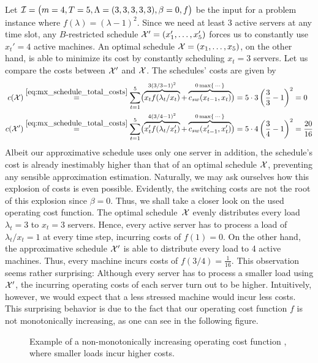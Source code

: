 \begin{exmpl}
Let $\mathcal{I}=\bigl(m=4,T=5,\Lambda=(3,3,3,3,3),\beta=0,f\bigr)$ be the input for a problem instance where $f(\lambda)=(\lambda-1)^2$. Since we need at least 3 active servers at any time slot, any $B$-restricted schedule $\mathcal{X}'=(x_1',\dotsc,x_5')$ forces us to constantly use $x_t'=4$ active machines. An optimal schedule $\mathcal{X}=(x_1,\dotsc,x_5)$, on the other hand, is able to minimize its cost by constantly scheduling $x_t=3$ servers. Let us compare the costs between $\mathcal{X}'$ and $\mathcal{X}$. The schedules' costs are given by
\begin{align*}
	c(\mathcal{X})&\stackrel{\eqref{eq:mx_schedule_total_costs}}{=}\sum\limits_{t=1}^{5}\bigl(\overbrace{x_tf(\lambda_t/x_t)}^{3(3/3-1)^2}+\overbrace{c_{sw}(x_{t-1},x_t)}^{0\max\{\,\cdots\}}\bigr)=5\cdot3\left(\frac{3}{3}-1\right)^2=0\\
	c(\mathcal{X}')&\stackrel{\eqref{eq:mx_schedule_total_costs}}{=}\sum\limits_{t=1}^{5}\bigl(\overbrace{x_t'f(\lambda_t/x_t')}^{4(3/4-1)^2}+\overbrace{c_{sw}(x_{t-1}',x_t')}^{0\max\{\,\cdots\}}\bigr)=5\cdot4\left(\frac{3}{4}-1\right)^2=\frac{20}{16} 
\end{align*}
Albeit our approximative schedule uses only one server in addition, the schedule's cost is already inestimably higher than that of an optimal schedule $\mathcal{X}$, preventing any sensible approximation estimation. Naturally, we may ask ourselves how this explosion of costs is even possible. Evidently, the switching costs are not the root of this explosion since $\beta=0$. Thus, we shall take a closer look on the used operating cost function. The optimal schedule~$\mathcal{X}$ evenly distributes every load $\lambda_t=3$ to $x_t=3$ servers. Hence, every active server has to process a load of $\lambda_t/x_t=1$ at every time step, incurring costs of $f(1)=0$. On the other hand, the approximative schedule $\mathcal{X}'$ is able to distribute every load to 4 active machines. Thus, every machine incurs costs of $f(3/4)=\frac{1}{16}$. This observation seems rather surprising: Although every server has to process a smaller load using $\mathcal{X}'$, the incurring operating costs of each server turn out to be higher. Intuitively, however, we would expect that a less stressed machine would incur less costs. This surprising behavior is due to the fact that our operating cost function $f$ is not monotonically increasing, as one can see in the following figure.
\begin{figure}[H]
\centering

\caption{Example of a non-monotonically increasing operating cost function , where smaller loads incur higher costs.}
\label{fig:non_mono_incr_f}
\end{figure}
\end{exmpl}
